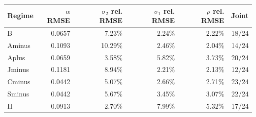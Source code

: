 \begin{tabular}{lrrrrr}
\toprule
Regime & $\alpha$ RMSE & $\sigma_2$ rel. RMSE & $\sigma_1$ rel. RMSE & $\rho$ rel. RMSE & Joint \\
\midrule
B & 0.0657 & 7.23\% & 2.24\% & 2.22\% & 18/24 \\
Aminus & 0.1093 & 10.29\% & 2.46\% & 2.04\% & 14/24 \\
Aplus & 0.0659 & 3.58\% & 5.82\% & 3.73\% & 20/24 \\
Jminus & 0.1181 & 8.94\% & 2.21\% & 2.13\% & 12/24 \\
Cminus & 0.0442 & 5.07\% & 2.66\% & 2.71\% & 23/24 \\
Sminus & 0.0442 & 5.67\% & 3.45\% & 3.07\% & 22/24 \\
H & 0.0913 & 2.70\% & 7.99\% & 5.32\% & 17/24 \\
\bottomrule
\end{tabular}
